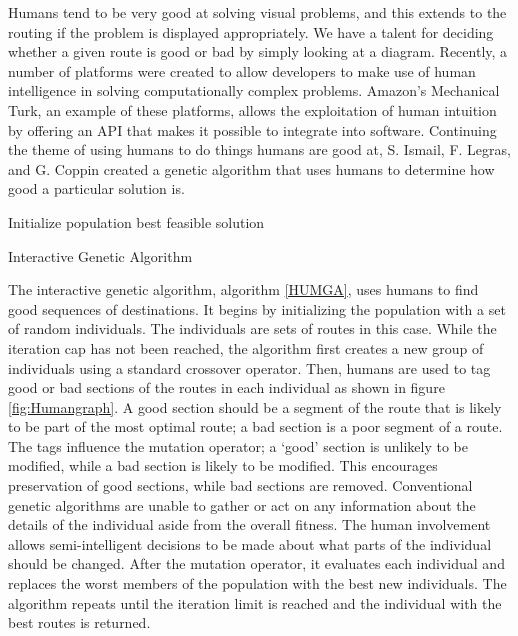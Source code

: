 \documentclass{sig-alternate}
\begin{document}
Humans tend to be very good at solving visual problems, and this extends to the routing if the problem is displayed appropriately. We have a talent for deciding whether a given route is good or bad by simply looking at a diagram. Recently, a number of platforms were created to allow developers to make use of human intelligence in solving computationally complex problems. Amazon's Mechanical Turk, an example of these platforms, allows the exploitation of human intuition by offering an API that makes it possible to integrate into software. 
	Continuing the theme of using humans to do things humans are good at, S. Ismail, F. Legras, and G. Coppin \cite{Ismail:2012} created a genetic algorithm that uses humans to determine how good a particular solution is. 


\begin{algorithm}[t]
Initialize population\;
\Return best feasible solution\;
\caption{Interactive Genetic Algorithm\label{HUMGA}}
\end{algorithm}

The interactive genetic algorithm, algorithm \ref{HUMGA}, uses humans to find good sequences of destinations. It begins by initializing the population with a set of random individuals. The individuals are sets of routes in this case. While the iteration cap has not been reached, the algorithm first creates a new group of individuals using a standard crossover operator. Then, humans are used to tag good or bad sections of the routes in each individual as shown in figure \ref{fig:Humangraph}. A good section should be a segment of the route that is likely to be part of the most optimal route; a bad section is a poor segment of a route. The tags influence the mutation operator; a `good' section is unlikely to be modified, while a bad section is likely to be modified. This encourages preservation of good sections, while bad sections are removed. Conventional genetic algorithms are unable to gather or act on any information about the details of the individual aside from the overall fitness. The human involvement allows semi-intelligent decisions to be made about what parts of the individual should be changed. After the mutation operator, it evaluates each individual and replaces the worst members of the population with the best new individuals. The algorithm repeats until the iteration limit is reached and the individual with the best routes is returned. 
\end{document}
